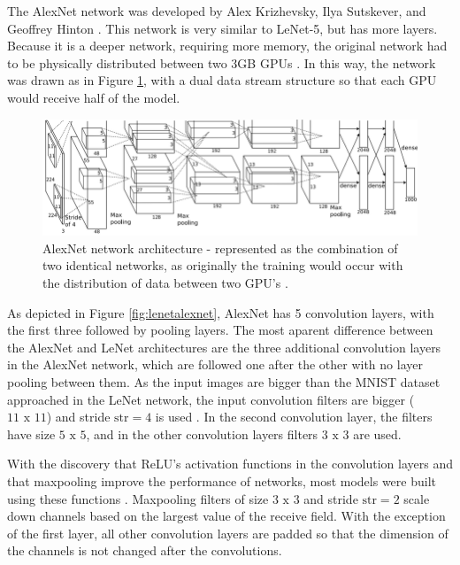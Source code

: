 The AlexNet network was developed by Alex Krizhevsky, Ilya Sutskever, and Geoffrey Hinton \cite{geron2019}. This network is very similar to LeNet-5, but has more layers. Because it is a deeper network, requiring more memory, the original network had to be physically distributed between two 3GB GPUs  \cite{krizhevsky2012}. In this way, the network was drawn as in Figure \ref{fig:alexnet}, with a dual data stream structure so that each GPU would receive half of the model.

\begin{figure}
    \centering
    \includegraphics[scale=0.4]{images/figure128.png}
    \caption{ AlexNet network architecture - represented as the combination of two identical networks, as originally the training would occur with the distribution of data between two GPU's \cite{krizhevsky2012}.}
    \label{fig:alexnet}
\end{figure}

As depicted in Figure \ref{fig:lenetalexnet}, AlexNet has 5 convolution layers, with the first three followed by pooling layers. The most aparent difference between the AlexNet and LeNet architectures are the three additional convolution layers in the AlexNet network, which are followed one after the other with no layer pooling between them. As the input images are bigger than the MNIST dataset approached in the LeNet network, the input convolution filters are bigger ($11\text{ x }11$) and stride $\text{str} = 4$ is used . In the second convolution layer, the filters have size $5\text{ x }5$, and in the other convolution layers filters $3\text{ x }3$ are used.

With the discovery that ReLU's activation functions in the convolution layers and that maxpooling improve the performance of networks, most models were built using these functions \cite{zhang2020dive}. Maxpooling filters of size $3\text{ x }3$ and stride $\text{str} = 2$ scale down channels based on the largest value of the receive field. With the exception of the first layer, all other convolution layers are padded so that the dimension of the channels is not changed after the convolutions.


